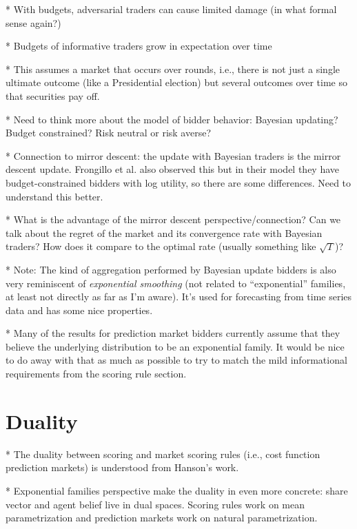 \documentclass[11pt,letterpaper]{article}
\begin{document}
* With budgets, adversarial traders can cause limited damage (in what formal sense again?)

* Budgets of informative traders grow in expectation over time

* This assumes a market that occurs over rounds, i.e., there is not just a single ultimate outcome (like a Presidential election) but several outcomes over time so that securities pay off.

* Need to think more about the model of bidder behavior: Bayesian updating? Budget constrained? Risk neutral or risk averse?

* Connection to mirror descent: the update with Bayesian traders is the mirror descent update. Frongillo et al. also observed this but in their model they have budget-constrained bidders with log utility, so there are some differences. Need to understand this better.

* What is the advantage of the mirror descent perspective/connection? Can we talk about the regret of the market and its convergence rate with Bayesian traders? How does it compare to the optimal rate (usually something like $\sqrt{T}$)?

* Note: The kind of aggregation performed by Bayesian update bidders is also very reminiscent of \emph{exponential smoothing} (not related to ``exponential'' families, at least not directly as far as I'm aware). It's used for forecasting from time series data and has some nice properties.

* Many of the results for prediction market bidders currently assume that they believe the underlying distribution to be an exponential family. It would be nice to do away with that as much as possible to try to match the mild informational requirements from the scoring rule section.



\section{Duality}

* The duality between scoring and market scoring rules (i.e., cost function prediction markets) is understood from Hanson's work.

* Exponential families perspective make the duality in even more concrete: share vector and agent belief live in dual spaces. Scoring rules work on mean parametrization and prediction markets work on natural parametrization.



\appendix





\end{document}
